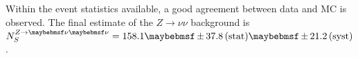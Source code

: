 Within the event statistics available, a good agreement between data and MC is observed. The final estimate of the $Z\rightarrow \nu\nu$ background is $N_{S}^{Z\rightarrow\nu\nu}= 158.1 \pm 37.8 \stat \pm 21.2 \syst$.
% 

